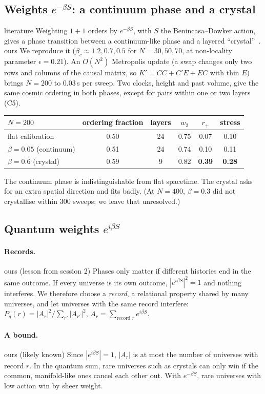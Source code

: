 \documentclass[11pt,a4paper]{article}
\newcommand{\tagbox}[2]{\textsf{\scriptsize\colorbox{#1!12}{\textcolor{#1!70!black}{#2}}}}
\newcommand{\lit}{\tagbox{blue}{literature}}
\newcommand{\ours}{\tagbox{orange}{ours}}
\begin{document}
\subsection{Weights $e^{-\beta S}$: a continuum phase and a crystal}
\lit{} Weighting $1+1$ orders by $e^{-\beta S}$, with $S$ the Benincasa--Dowker action, gives a phase transition between a continuum-like phase and a layered ``crystal''~\cite{Surya12,BHS08,GOS18}. \ours{} We reproduce it ($\beta_c\approx1.2,0.7,0.5$ for $N=30,50,70$, at non-locality parameter $\epsilon=0.21$). An $O(N^2)$ Metropolis update (a swap changes only two rows and columns of the causal matrix, so $K'=CC+C'E+EC$ with thin $E$) brings $N=200$ to $0.03$\,s per sweep. Two clocks, height and past volume, give the same cosmic ordering in both phases, except for pairs within one or two layers (C5).
\begin{center}\small
\begin{tabular}{@{}lccccc@{}}
\toprule
$N=200$ & ordering fraction & layers & $w_2$ & $r_+$ & stress\\
\midrule
flat calibration & 0.50 & 24 & 0.75 & 0.07 & 0.10\\
$\beta=0.05$ (continuum) & 0.51 & 24 & 0.74 & 0.10 & 0.11\\
$\beta=0.6$ (crystal) & 0.59 & 9 & 0.82 & \textbf{0.39} & \textbf{0.28}\\
\bottomrule
\end{tabular}
\end{center}
The continuum phase is indistinguishable from flat spacetime. The crystal asks for an extra spatial direction and fits badly. (At $N=400$, $\beta=0.3$ did not crystallise within 300 sweeps; we leave that unresolved.)

\subsection{Quantum weights $e^{i\beta S}$}
\paragraph{Records.} \ours{} (lesson from session 2) Phases only matter if different histories end in the same outcome. If every universe is its own outcome, $|e^{i\beta S}|^2=1$ and nothing interferes. We therefore choose a \emph{record}, a relational property shared by many universes, and let universes with the same record interfere: $P_q(r)=|A_r|^2/\sum_{r'}|A_{r'}|^2$, $A_r=\sum_{\text{record }r}e^{i\beta S}$.

\paragraph{A bound.} \ours{} (likely known) Since $|e^{i\beta S}|=1$, $|A_r|$ is at most the number of universes with record $r$. In the quantum sum, rare universes such as crystals can only win if the common, manifold-like ones cancel each other out. With $e^{-\beta S}$, rare universes with low action win by sheer weight.
\end{document}
